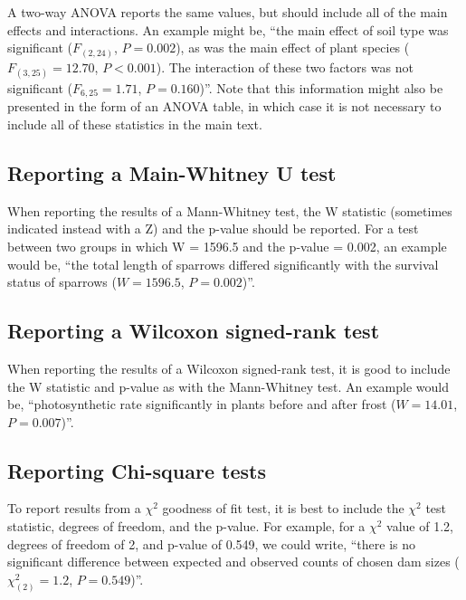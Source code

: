 \documentclass[
]{scrbook}
\begin{document}
A two-way ANOVA reports the same values, but should include all of the main effects and interactions. An example might be, ``the main effect of soil type was significant (\(F_{(2, 24)}\), \(P = 0.002\)), as was the main effect of plant species (\(F_{(3, 25)} = 12.70\), \(P < 0.001\)). The interaction of these two factors was not significant (\(F_{6, 25} = 1.71\), \(P = 0.160\))''.
Note that this information might also be presented in the form of an ANOVA table, in which case it is not necessary to include all of these statistics in the main text.

\hypertarget{reporting-a-main-whitney-u-test}{%
\subsection{Reporting a Main-Whitney U test}\label{reporting-a-main-whitney-u-test}}

When reporting the results of a Mann-Whitney test, the W statistic (sometimes indicated instead with a Z) and the p-value should be reported.
For a test between two groups in which W = 1596.5 and the p-value = 0.002, an example would be, ``the total length of sparrows differed significantly with the survival status of sparrows (\(W = 1596.5\), \(P = 0.002\))''.

\hypertarget{reporting-a-wilcoxon-signed-rank-test}{%
\subsection{Reporting a Wilcoxon signed-rank test}\label{reporting-a-wilcoxon-signed-rank-test}}

When reporting the results of a Wilcoxon signed-rank test, it is good to include the W statistic and p-value as with the Mann-Whitney test.
An example would be, ``photosynthetic rate significantly in plants before and after frost (\(W = 14.01\), \(P = 0.007\))''.

\hypertarget{reporting-chi-square-tests}{%
\subsection{Reporting Chi-square tests}\label{reporting-chi-square-tests}}

To report results from a \(\chi^{2}\) goodness of fit test, it is best to include the \(\chi^{2}\) test statistic, degrees of freedom, and the p-value.
For example, for a \(\chi^{2}\) value of 1.2, degrees of freedom of 2, and p-value of 0.549, we could write, ``there is no significant difference between expected and observed counts of chosen dam sizes (\(\chi^{2}_{(2)} = 1.2\), \(P = 0.549\))''.
\end{document}
